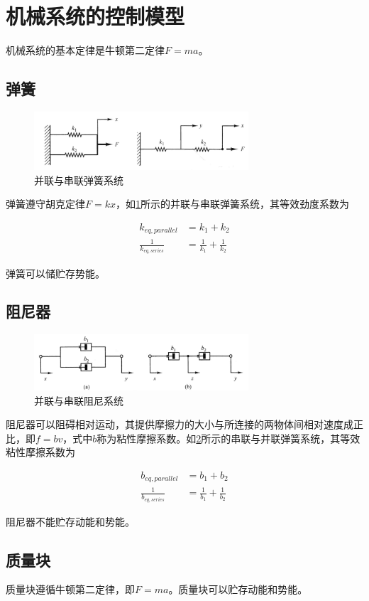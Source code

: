 \section{机械系统的控制模型}
机械系统的基本定律是牛顿第二定律$F=ma$。
\subsection{弹簧}
\begin{figure}[!ht]
	\centering
	\includegraphics[width=8cm]{figures/3.png}
	\caption{并联与串联弹簧系统}
	\label{3}
\end{figure}

弹簧遵守胡克定律$F=kx$，如\ref{3}所示的并联与串联弹簧系统，其等效劲度系数为

\begin{align*}
k_{eq,parallel}&=k_1+k_2\\
\frac{1}{k_{eq,series}}&=\frac{1}{k_1}+\frac{1}{k_2}
\end{align*}

弹簧可以储贮存势能。

\subsection{阻尼器}

\begin{figure}[!ht]
	\centering
	\includegraphics[width=8cm]{figures/4.png}
	\caption{并联与串联阻尼系统}
	\label{4}
\end{figure}

阻尼器可以阻碍相对运动，其提供摩擦力的大小与所连接的两物体间相对速度成正比，即$f=bv$，式中$b$称为粘性摩擦系数。如\ref{4}所示的串联与并联弹簧系统，其等效粘性摩擦系数为

\begin{align*}
b_{eq,parallel}&=b_1+b_2\\
\frac{1}{b_{eq,series}}&=\frac{1}{b_1}+\frac{1}{b_2}
\end{align*}

阻尼器不能贮存动能和势能。

\subsection{质量块}

质量块遵循牛顿第二定律，即$F=ma$。质量块可以贮存动能和势能。